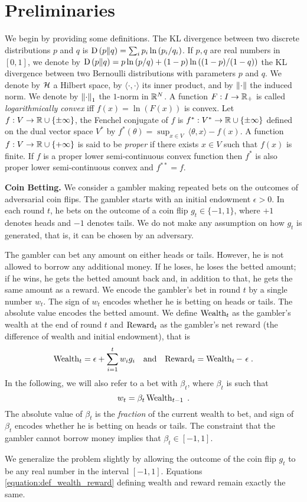 \section{Preliminaries}
\label{section:preliminaries}

We begin by providing some definitions.  The \ac{KL} divergence between two
discrete distributions $p$ and $q$ is $\operatorname{D}\left({p}\middle\|{q}\right) = \sum_{i} p_i \ln\left(
p_i/q_i \right)$. If $p,q$ are real numbers in $[0,1]$, we denote by $\operatorname{D}\left({p}\middle\|{q}\right) =
p \ln \left(p/q \right) + (1-p) \ln \left((1-p)/(1-q) \right)$ the \ac{KL}
divergence between two Bernoulli distributions with parameters $p$ and $q$.  We
denote by $\mathcal{H}$ a Hilbert space, by $\langle \cdot, \cdot\rangle$ its inner
product, and by $\left\|{\cdot}\right\|$ the induced norm.  We denote by $\left\|{\cdot}\right\|_1$
the $1$-norm in $\mathbb{R}^N$.  A function $F:I \to \mathbb{R}_+$ is called
\emph{logarithmically convex} iff $f(x) = \ln(F(x))$ is convex.  Let $f:V \to \mathbb{R}
\cup \{\pm\infty\}$, the Fenchel conjugate of $f$ is $f^*:V^* \to \mathbb{R} \cup \{\pm
\infty\}$ defined on the dual vector space $V^*$ by $f^*(\theta) = \sup_{x \in
V} \ \langle \theta, x \rangle - f(x)$.  A function $f:V \to \mathbb{R} \cup
\{+\infty\}$ is said to be \emph{proper} if there exists $x \in V$ such that
$f(x)$ is finite.  If $f$ is a proper lower semi-continuous convex function then
$f^*$ is also proper lower semi-continuous convex and $f^{**}=f$.

\textbf{Coin Betting.} We consider a gambler making repeated bets on the
outcomes of adversarial coin flips. The gambler starts with an initial
endowment $\epsilon > 0$. In each round $t$, he bets on the outcome of a coin
flip $g_t \in \{-1,1\}$, where $+1$ denotes heads and $-1$ denotes tails.  We
do not make any assumption on how $g_t$ is generated, that is, it can be chosen
by an adversary.

The gambler can bet any amount on either heads or tails. However, he is not
allowed to borrow any additional money. If he loses, he loses the betted
amount; if he wins, he gets the betted amount back and, in addition to that, he
gets the same amount as a reward.  We encode the gambler's bet in round $t$ by
a single number $w_t$. The sign of $w_t$ encodes whether he is betting on heads
or tails. The absolute value encodes the betted amount.  We define $\operatorname{Wealth}_t$
as the gambler's wealth at the end of round $t$ and $\operatorname{Reward}_t$ as the
gambler's net reward (the difference of wealth and initial endowment), that is
\begin{align}
\label{equation:def_wealth_reward}
\operatorname{Wealth}_t = \epsilon + \sum_{i=1}^t w_i g_i &
& \text{and} &
& \operatorname{Reward}_t = \operatorname{Wealth}_t - \ \epsilon \; .
\end{align}
In the following, we will also refer to a bet with $\beta_t$, where $\beta_t$
is such that
\begin{equation}
\label{equation:def_wt}
w_t = \beta_t \operatorname{Wealth}_{t-1} \; .
\end{equation}
The absolute value of $\beta_t$ is the \emph{fraction} of the current wealth to
bet, and sign of $\beta_t$ encodes whether he is betting on heads or tails. The
constraint that the gambler cannot borrow money implies that $\beta_t \in
[-1,1]$.

We generalize the problem slightly by allowing the outcome of the coin flip
$g_t$ to be any real number in the interval $[-1,1]$.  Equations
\eqref{equation:def_wealth_reward} defining wealth and reward remain exactly
the same.
